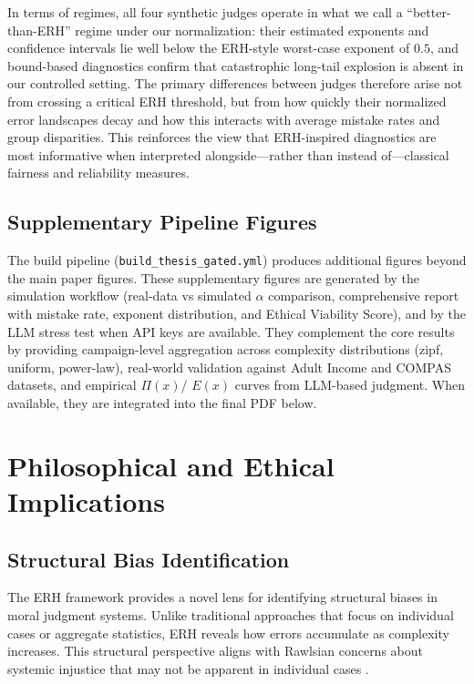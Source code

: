 \documentclass[12pt,a4paper]{article}
\theoremstyle{definition}
\theoremstyle{remark}
\begin{document}
In terms of regimes, all four synthetic judges operate in what we call a ``better-than-ERH'' regime under our normalization: their estimated exponents and confidence intervals lie well below the ERH-style worst-case exponent of $0.5$, and bound-based diagnostics confirm that catastrophic long-tail explosion is absent in our controlled setting. The primary differences between judges therefore arise not from crossing a critical ERH threshold, but from how quickly their normalized error landscapes decay and how this interacts with average mistake rates and group disparities. This reinforces the view that ERH-inspired diagnostics are most informative when interpreted alongside---rather than instead of---classical fairness and reliability measures.

\subsection{Supplementary Pipeline Figures}

The build pipeline (\texttt{build\_thesis\_gated.yml}) produces additional figures beyond the main paper figures. These supplementary figures are generated by the simulation workflow (real-data vs simulated $\alpha$ comparison, comprehensive report with mistake rate, exponent distribution, and Ethical Viability Score), and by the LLM stress test when API keys are available. They complement the core results by providing campaign-level aggregation across complexity distributions (zipf, uniform, power-law), real-world validation against Adult Income and COMPAS datasets, and empirical $\Pi(x)$/ $E(x)$ curves from LLM-based judgment. When available, they are integrated into the final PDF below.

\section{Philosophical and Ethical Implications}
\label{sec:philosophy}

\subsection{Structural Bias Identification}

The ERH framework provides a novel lens for identifying structural biases in moral judgment systems. Unlike traditional approaches that focus on individual cases or aggregate statistics, ERH reveals how errors accumulate as complexity increases. This structural perspective aligns with Rawlsian concerns about systemic injustice that may not be apparent in individual cases \citep{rawls1971}.
\end{document}
